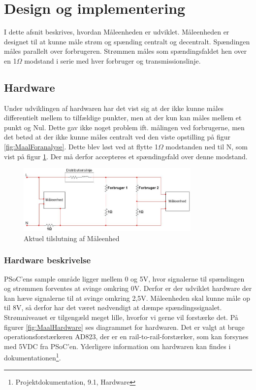 
\section{Design og implementering}
I dette afsnit beskrives, hvordan Måleenheden er udviklet. Måleenheden er designet til at kunne måle strøm og spænding centralt og decentralt. Spændingen måles parallelt over forbrugeren. Strømmen måles som spændingsfaldet hen over en 1$\Omega$ modstand i serie med hver forbruger og transmissionslinje. 

\subsection{Hardware}

Under udviklingen af hardwaren har det vist sig at der ikke kunne måles differentielt mellem to tilfældige punkter, men at der kun kan måles mellem et punkt og Nul. Dette gav ikke noget problem ift. målingen ved forbrugerne, men det betød at der ikke kunne måles centralt ved den viste opstilling på figur \ref{fig:MaalForanalyse}. Dette blev løst ved at flytte 1$\Omega$ modstanden ned til N, som vist på figur \ref{fig:MaalAktuel}. Der må derfor accepteres et spændingsfald over denne modstand.

\begin{figure}[H] %
	\centering
	\includegraphics[width=0.8\textwidth]{figure/MaalAktuel}
	\caption{Aktuel tilslutning af Måleenhed}
	\label{fig:MaalAktuel}
\end{figure} 


\subsubsection{Hardware beskrivelse}
PSoC'ens sample område ligger mellem 0 og 5V, hvor signalerne til spændingen og strømmen forventes at svinge omkring 0V. Derfor er der udviklet hardware der kan hæve signalerne til at svinge omkring 2,5V. Måleenheden skal kunne måle op til 8V, så derfor har det været nødvendigt at dæmpe spændingssignalet. Strømniveauet er tilgengæld meget lille, hvorfor vi gerne vil forstærke det. På figurer \ref{fig:MaalHardware} ses diagrammet for hardwaren. Det er valgt at bruge operationsforstærkeren AD823, der er en rail-to-rail-forstærker, som kan forsynes med 5VDC fra PSoC'en. Yderligere information om hardwaren kan findes i dokumentationen\footnote{Projektdokumentation, 9.1, Hardware}.  
  

